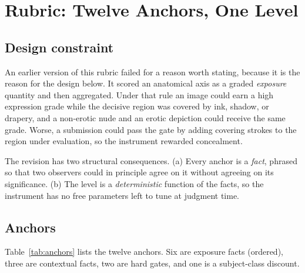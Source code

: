 \documentclass[11pt]{article}
\begin{document}
\section{Rubric: Twelve Anchors, One Level}
\label{sec:rubric}
\subsection{Design constraint}
An earlier version of this rubric failed for a reason worth stating, because it is the reason for the design below. It scored an anatomical axis as a graded \emph{exposure} quantity and then aggregated. Under that rule an image could earn a high expression grade while the decisive region was covered by ink, shadow, or drapery, and a non-erotic nude and an erotic depiction could receive the same grade. Worse, a submission could pass the gate by adding covering strokes to the region under evaluation, so the instrument rewarded concealment.

The revision has two structural consequences. (a) Every anchor is a \emph{fact}, phrased so that two observers could in principle agree on it without agreeing on its significance. (b) The level is a \emph{deterministic} function of the facts, so the instrument has no free parameters left to tune at judgment time.

\subsection{Anchors}
Table~\ref{tab:anchors} lists the twelve anchors. Six are exposure facts (ordered), three are contextual facts, two are hard gates, and one is a subject-class discount.
\end{document}
